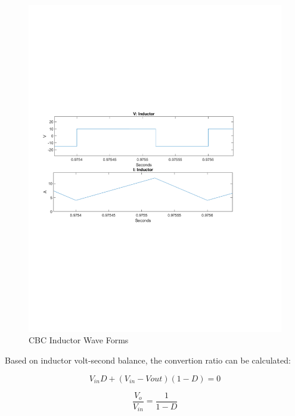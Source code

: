 \begin{figure}[H]
   \centering
   \includegraphics[width=\textwidth]{figures/aConventionalBoost/LvAndLi.pdf}
    \caption{CBC Inductor Wave Forms}
	\label{fig:ConventionalBoostOFF}
\end{figure}

Based on inductor volt-second balance, the convertion ratio can be calculated:

\begin{equation}
	V_{in}D + (V_{in}-V{out})(1-D) = 0
	\label{eq:pumpHeadModel}
\end{equation}

\begin{equation}
	\frac{V_o}{V_{in}} = \frac{1}{1-D}
	\label{eq:pumpHeadMode5}
\end{equation}
